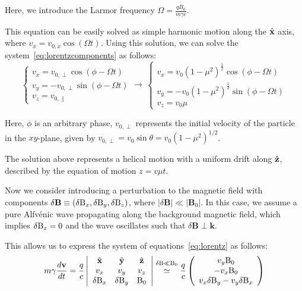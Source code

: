 Here, we introduce the Larmor frequency $\Omega = \frac{q B_0}{m \gamma c}$.

This equation can be easily solved as simple harmonic motion along the $\hat{\vb x}$ axis, where $v_{x} = v_{0,x} \cos (\Omega t)$. Using this solution, we can solve the system~\eqref{eq:lorentzcomponents} as follows:
%
\begin{equation}
\begin{cases}
v_x = v_{0,\perp} \cos (\phi - \Omega t) \\
v_y = - v_{0,\perp} \sin (\phi - \Omega t) \\
v_z = v_{0,\parallel}
\end{cases}
\rightarrow \, 
\begin{cases}
v_x = v_{0} (1 - \mu^2)^{\frac{1}{2}} \cos (\phi - \Omega t) \\
v_y = - v_{0} (1 - \mu^2)^{\frac{1}{2}} \sin (\phi - \Omega t) \\
v_z = v_{0} \mu
\end{cases}
\end{equation}

Here, $\phi$ is an arbitrary phase, $v_{0,\perp}$ represents the initial velocity of the particle in the $xy$-plane, given by $v_{0,\perp} = v_0 \sin \theta = v_0 (1-\mu^2)^{1/2}$.

The solution above represents a helical motion with a uniform drift along $\hat{\vb z}$, described by the equation of motion $z = v \mu t$.

Now we consider introducing a perturbation to the magnetic field with components $\delta \mathbf{B} \equiv (\delta {\rm B}_x, \delta {\rm B}_y, \delta {\rm B}_z)$, where $|\delta \mathbf{B}| \ll |\mathbf{B}_0|$. In this case, we assume a pure Alfvénic wave propagating along the background magnetic field, which implies $\delta {\rm B}_z = 0$ and the wave oscillates such that $\delta \mathbf{B} \perp \mathbf{k}$.

This allows us to express the system of equations~\eqref{eq:lorentz} as follows:
%
\begin{equation}
m \gamma \frac{d\vb v}{dt} = \frac{q}{c}
\left|
\begin{array}{ccc}
\hat {\vb x}  & \hat {\vb y}  & \hat {\vb z}  \\
v_x & v_y & v_z \\
\delta {\rm B}_x & \delta {\rm B}_y & {\rm B}_0 
\end{array}
\right|
\oset{\delta {\rm B} \ll {\rm B}_0} \simeq
\frac{q}{c}
\left(
\begin{array}{c}
v_y {\rm B}_0 \\
-v_x {\rm B}_0 \\
v_x \delta {\rm B}_y - v_y \delta {\rm B}_x
\end{array}
\right)
\end{equation}

